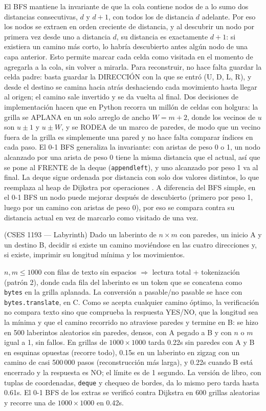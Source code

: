  El BFS mantiene la invariante de que la cola contiene nodos de a lo sumo dos distancias consecutivas, $d$ y $d+1$, con todos los de distancia $d$ adelante. Por eso los nodos se extraen en orden creciente de distancia, y al descubrir un nodo por primera vez desde uno a distancia $d$, su distancia es exactamente $d+1$: si existiera un camino más corto, lo habría descubierto antes algún nodo de una capa anterior. Esto permite marcar cada celda como visitada en el momento de agregarla a la cola, sin volver a mirarla. Para reconstruir, no hace falta guardar la celda padre: basta guardar la DIRECCIÓN con la que se entró (U, D, L, R), y desde el destino se camina hacia atrás deshaciendo cada movimiento hasta llegar al origen; el camino sale invertido y se da vuelta al final. Dos decisiones de implementación hacen que en Python recorra un millón de celdas con holgura: la grilla se APLANA en un solo arreglo de ancho $W = m + 2$, donde los vecinos de $u$ son $u \pm 1$ y $u \pm W$, y se RODEA de un marco de paredes, de modo que un vecino fuera de la grilla es simplemente una pared y no hace falta comparar índices en cada paso. El 0-1 BFS generaliza la invariante: con aristas de peso 0 o 1, un nodo alcanzado por una arista de peso 0 tiene la misma distancia que el actual, así que se pone al FRENTE de la deque (\texttt{appendleft}), y uno alcanzado por peso 1 va al final. La deque sigue ordenada por distancia con solo dos valores distintos, lo que reemplaza al heap de Dijkstra por operaciones . A diferencia del BFS simple, en el 0-1 BFS un nodo puede mejorar después de descubierto (primero por peso 1, luego por un camino con aristas de peso 0), por eso se compara contra su distancia actual en vez de marcarlo como visitado de una vez.


(CSES 1193 — Labyrinth) Dado un laberinto de $n \times m$ con paredes, un inicio A y un destino B, decidir si existe un camino moviéndose en las cuatro direcciones y, si existe, imprimir su longitud mínima y los movimientos.

 $n, m \le 1000$ con filas de texto sin espacios $\Rightarrow$ lectura total + tokenización (patrón 2), donde cada fila del laberinto es un token que se concatena como \texttt{bytes} en la grilla aplanada. La conversión a pasable/no pasable se hace con \texttt{bytes.translate}, en C. Como se acepta cualquier camino óptimo, la verificación no compara texto sino que comprueba la respuesta YES/NO, que la longitud sea la mínima y que el camino recorrido no atraviese paredes y termine en B: se hizo en 500 laberintos aleatorios sin paredes, densos, con A pegado a B y con $n$ o $m$ igual a 1, sin fallos. En grillas de $1000 \times 1000$ tarda \aprox{}0.22s sin paredes con A y B en esquinas opuestas (recorre todo), \aprox{}0.15s en un laberinto en zigzag con un camino de casi 500\,000 pasos (reconstrucción más larga), y \aprox{}0.22s cuando B está encerrado y la respuesta es NO; el límite es de 1 segundo. La versión de libro, con tuplas de coordenadas, \texttt{deque} y chequeo de bordes, da lo mismo pero tarda hasta \aprox{}0.61s. El 0-1 BFS de los extras se verificó contra Dijkstra en 600 grillas aleatorias y recorre una de $1000 \times 1000$ en \aprox{}0.42s.

